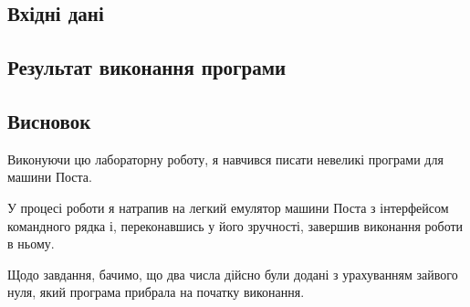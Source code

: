 \documentclass[a4paper, 12pt, oneside]{extarticle}
\begin{document}
\subsection*{Вхідні дані}


\subsection*{Результат виконання програми}



\subsection*{Висновок}

Виконуючи цю лабораторну роботу, я навчився писати
невеликі програми для машини Поста.

У процесі роботи
я натрапив на легкий емулятор машини Поста з інтерфейсом
командного рядка і, переконавшись у його зручності, завершив
виконання роботи в ньому.

Щодо завдання, бачимо, що два числа дійсно були додані з урахуванням зайвого нуля,
який програма прибрала на початку виконання.
\end{document}
